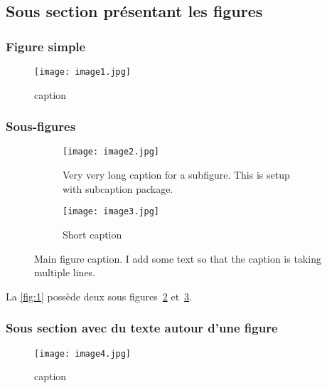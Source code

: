 \subsection{Sous section présentant les figures}

\subsubsection{Figure simple}

\blindtext[3]
\begin{figure}[htbp]
    \centering
    \texttt{[image: image1.jpg]}
    \caption{caption}%
    \label{fig:label}
\end{figure}

\subsubsection{Sous-figures}

\blindtext[4]
\begin{figure}[htbp]
    \centering
    \begin{subfigure}[t]{0.49\textwidth}
        \centering
        \texttt{[image: image2.jpg]}
        \caption{Very very long caption for a subfigure. This is setup with subcaption package.}%
        \label{fig:1a}
    \end{subfigure}
    \hfill
    \begin{subfigure}[t]{0.49\textwidth}
        \centering
        \texttt{[image: image3.jpg]}
        \caption{Short caption}%
        \label{fig:1b}
    \end{subfigure}
    \caption{Main figure caption. I add some text so that the caption is taking multiple lines.}%
    \label{fig:1}
\end{figure}

La \autoref{fig:1} possède deux sous figures~\ref{fig:1a} et~\ref{fig:1b}.

\subsubsection{Sous section avec du texte autour d'une figure}

\blindtext[1]

\begin{wrapfigure}{r}{0.5\textwidth} %
    \centering
    \texttt{[image: image4.jpg]}%
    \caption{caption}%
    \label{fig:wrapfig}
\end{wrapfigure}

